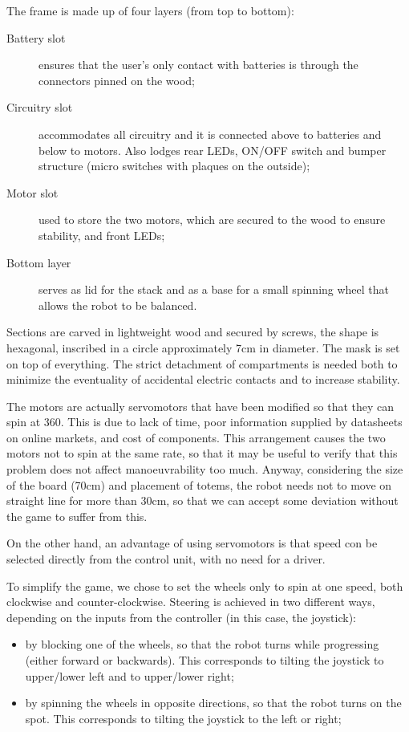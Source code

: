 \documentclass[a4paper,twoside]{book}
\begin{document}
\beforelist The frame is made up of four layers (from top to bottom):
\begin{description}
\item[Battery slot] ensures that the user's only contact with batteries is through the connectors pinned on the wood;
\item[Circuitry slot] accommodates all circuitry and it is connected above to batteries and below to motors. Also lodges rear LEDs, ON/OFF switch and bumper structure (micro switches with plaques on the outside);
\item[Motor slot] used to store the two motors, which are secured to the wood to ensure stability, and front LEDs;
\item[Bottom layer] serves as lid for the stack and as a base for a small spinning wheel that allows the robot to be balanced.
\end{description}
\afterlist*
Sections are carved in lightweight wood and secured by screws, the shape is hexagonal, inscribed in a circle approximately 7cm in diameter. The mask is set on top of everything. The strict detachment of compartments is needed both to minimize the eventuality of accidental electric contacts and to increase stability.

The motors are actually servomotors that have been modified so that they can spin at 360\degree. This is due to lack of time, poor information supplied by datasheets on online markets, and cost of components. This arrangement causes the two motors not to spin at the same rate, so that it may be useful to verify that this problem does not affect manoeuvrability too much. Anyway, considering the size of the board (70cm) and placement of totems, the robot needs not to move on straight line for more than 30cm, so that we can accept some deviation without the game to suffer from this.

On the other hand, an advantage of using servomotors is that speed con be selected directly from the control unit, with no need for a driver.

\beforelist* To simplify the game, we chose to set the wheels only to spin at one speed, both clockwise and counter-clockwise. Steering is achieved in two different ways, depending on the inputs from the controller (in this case, the joystick):
\begin{itemize}
\item by blocking one of the wheels, so that the robot turns while progressing (either forward or backwards). This corresponds to tilting the joystick to upper/lower left and to upper/lower right;
\item by spinning the wheels in opposite directions, so that the robot turns on the spot. This corresponds to tilting the joystick to the left or right;
\end{itemize}
\afterlist*
\end{document}
